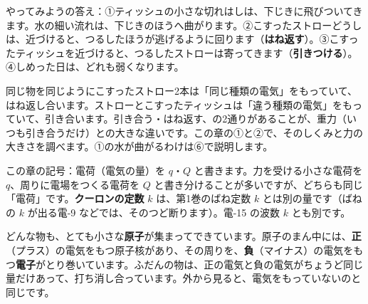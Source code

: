 \noindent やってみようの答え：①ティッシュの小さな切れはしは、下じきに飛びついてきます。水の細い流れは、下じきのほうへ曲がります。②こすったストローどうしは、近づけると、つるしたほうが逃げるように回ります（\textbf{はね返す}）。③こすったティッシュを近づけると、つるしたストローは寄ってきます（\textbf{引きつける}）。④しめった日は、どれも弱くなります。

同じ物を同じようにこすったストロー2本は「同じ種類の電気」をもっていて、はね返し合います。ストローとこすったティッシュは「違う種類の電気」をもっていて、引き合います。引き合う・はね返す、の2通りがあることが、重力（いつも引き合うだけ）との大きな違いです。この章の①と②で、そのしくみと力の大きさを調べます。①の水が曲がるわけは⑥で説明します。

\begin{omoidasou}
\end{omoidasou}

\noindent この章の記号：電荷（電気の量）を $q$・$Q$ と書きます。力を受ける小さな電荷を $q$、周りに電場をつくる電荷を $Q$ と書き分けることが多いですが、どちらも同じ「電荷」です。\textbf{クーロンの定数} $k$ は、第1巻のばね定数 $k$ とは別の量です（ばねの $k$ が出る電-9 などでは、そのつど断ります）。電-15 の波数 $k$ とも別です。


\label{ph:電-1:sec1}
どんな物も、とても小さな\textbf{原子}が集まってできています。原子のまん中には、\textbf{正}（プラス）の電気をもつ原子核があり、その周りを、\textbf{負}（マイナス）の電気をもつ\textbf{電子}がとり巻いています。ふだんの物は、正の電気と負の電気がちょうど同じ量だけあって、打ち消し合っています。外から見ると、電気をもっていないのと同じです。

